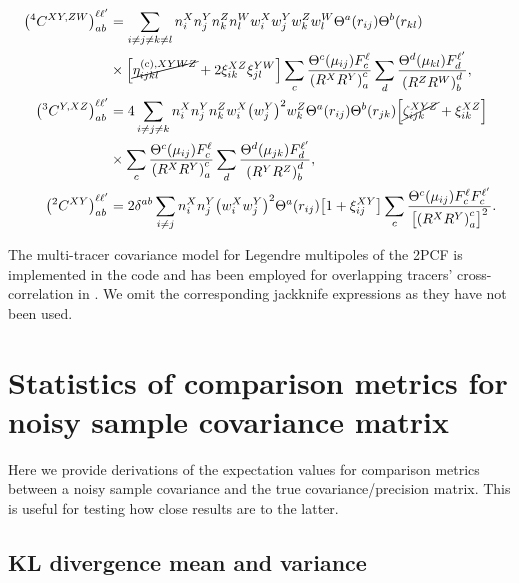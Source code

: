 \begin{align} \label{eq:Cov2x2_234_Point_Defs_Legendre_Projected-multi}
\qty(^4C^{XY,ZW})_{ab}^{\ell\ell'} &= \sum_{i\neq j\neq k\neq l} n^X_i n^Y_j n^Z_k n^W_l w^X_i w^Y_j w^Z_k w^W_l \Theta^a(r_{ij}) \Theta^b(r_{kl}) \\ \nonumber
& \times \qty[\cancel{\eta^{({\rm c}),XYWZ}_{ijkl}} + 2\xi^{XZ}_{ik} \xi^{YW}_{jl}] \sum_c \frac{\Theta^c(\mu_{ij}) F^\ell_c}{\qty(R^XR^Y)_a^c} \sum_d \frac{\Theta^d(\mu_{kl}) F^{\ell'}_d}{\qty(R^ZR^W)_b^d}, \\ \nonumber
\qty(^3C^{Y,XZ})_{ab}^{\ell\ell'} &= 4 \sum_{i\neq j\neq k} n^X_i n^Y_j n^Z_k w^X_i \qty(w^Y_j)^2 w^Z_k \Theta^a(r_{ij}) \Theta^b(r_{jk}) \qty[\cancel{\zeta^{XYZ}_{ijk}} + \xi^{XZ}_{ik}] \\ \nonumber
& \times \sum_c \frac{\Theta^c(\mu_{ij}) F^\ell_c}{\qty(R^XR^Y)_a^c} \sum_d \frac{\Theta^d(\mu_{jk}) F^{\ell'}_d}{\qty(R^YR^Z)_b^d}, \\ \nonumber
\qty(^2C^{XY})_{ab}^{\ell\ell'} &= 2\delta^{ab} \sum_{i\neq j} n^X_i n^Y_j \qty(w^X_i w^Y_j)^2 \Theta^a(r_{ij}) \qty[1+\xi^{XY}_{ij}] \sum_c \frac{\Theta^c(\mu_{ij}) F^\ell_c F^{\ell'}_c}{\qty[\qty(R^XR^Y)_a^c]^2}.
\end{align}

The multi-tracer covariance model for Legendre multipoles of the 2PCF is implemented in the code and has been employed for overlapping tracers' cross-correlation in \cite{KP4s5-Valcin}.
We omit the corresponding jackknife expressions as they have not been used.

\section{Statistics of comparison metrics for noisy sample covariance matrix}
\label{sec:cov-comparison-properties}

Here we provide derivations of the expectation values for comparison metrics between a noisy sample covariance and the true covariance/precision matrix.
This is useful for testing how close \rascalc{} results are to the latter.

\subsection{KL divergence mean and variance}
\label{subsec:kl-div-stats}

